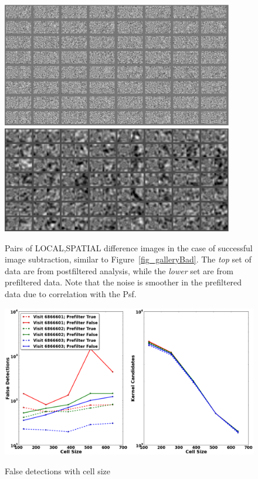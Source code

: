 \documentclass[prd, nofootinbib, floatfix, 11pt,tightenlines,times]{article}
\begin{document}
\begin{figure}
\begin{center}
\includegraphics[width=0.9\textwidth]{figures/normal2.eps} \\
\includegraphics[width=0.9\textwidth]{figures/preconv2.eps} \\
\end{center}
\caption{Pairs of LOCAL,SPATIAL difference images in the case of
  successful image subtraction, similar to
  Figure~\ref{fig_galleryBad}.  The {\it top} set of data are from
  postfiltered analysis, while the {\it lower} set are from
  prefiltered data.  Note that the noise is smoother in the
  prefiltered data due to correlation with the Psf. }
\label{fig_galleryGood}
\end{figure}

\begin{figure}
\includegraphics[width=1.0\textwidth]{figures/cellsize.eps} \\
\caption{False detections with cell size
}
\label{cellsize}
\end{figure}
\end{document}
